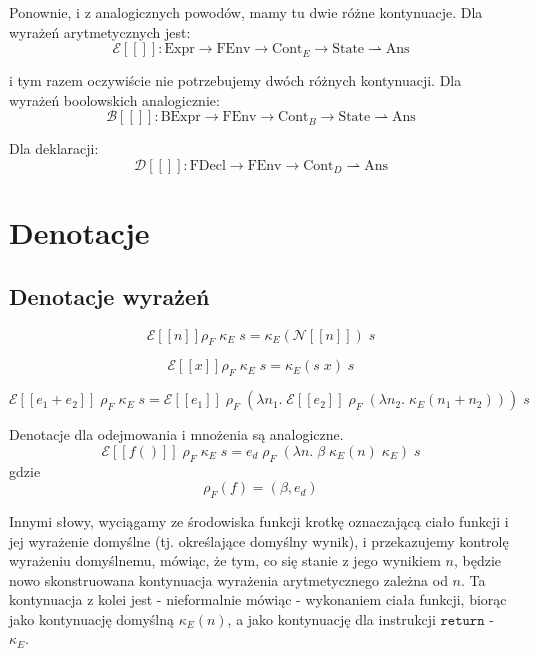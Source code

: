 \documentclass[a4paper]{article}
\begin{document}
Ponownie, i z analogicznych powodów, mamy tu dwie różne kontynuacje. Dla wyrażeń arytmetycznych jest:
$$
\mathcal{E}[\![]\!]: \text{Expr} \longrightarrow \text{FEnv} \longrightarrow \text{Cont}_E \longrightarrow \text{State} \rightharpoonup \text{Ans}
$$

i tym razem oczywiście nie potrzebujemy dwóch różnych kontynuacji. Dla wyrażeń boolowskich analogicznie:
$$
\mathcal{B}[\![]\!]: \text{BExpr} \longrightarrow \text{FEnv} \longrightarrow \text{Cont}_B \longrightarrow \text{State} \rightharpoonup \text{Ans}
$$

Dla deklaracji:
$$
\mathcal{D}[\![]\!]: \text{FDecl} \longrightarrow \text{FEnv} \longrightarrow \text{Cont}_D \rightharpoonup \text{Ans}
$$


\section*{Denotacje}

\subsection*{Denotacje wyrażeń}

$$
\mathcal{E}[\![n]\!] \rho_F \; \kappa_E \; s = \kappa_E(\mathcal{N}[\![n]\!]) \; s
$$

$$
\mathcal{E}[\![ x ]\!] \rho_F \; \kappa_E \; s = \kappa_E(s \; x) \; s
$$

$$
\mathcal{E}[\![e_1 + e_2]\!] \; \rho_F \; \kappa_E \; s = \mathcal{E}[\![e_1]\!] \; \rho_F \; (\lambda n_1. \;
\mathcal{E}[\![e_2]\!] \; \rho_F \; (\lambda n_2. \;
\kappa_E (n_1+n_2))) \; s
$$

Denotacje dla odejmowania i mnożenia są analogiczne. \\

$$
\mathcal{E}[\![ f() ]\!] \; \rho_F \; \kappa_E \; s = e_d \; \rho_F \; (\lambda n. \; \beta \; \kappa_E(n) \; \kappa_E)\;  s
$$
gdzie
$$
\rho_F(f) = (\beta, e_d)
$$

Innymi słowy, wyciągamy ze środowiska funkcji krotkę oznaczającą ciało funkcji i jej wyrażenie domyślne (tj. określające domyślny wynik), i przekazujemy kontrolę wyrażeniu domyślnemu, mówiąc, że tym, co się stanie z jego wynikiem $n$, będzie nowo skonstruowana kontynuacja wyrażenia arytmetycznego zależna od $n$. Ta kontynuacja z kolei jest - nieformalnie mówiąc - wykonaniem ciała funkcji, biorąc jako kontynuację domyślną $\kappa_E(n)$, a jako kontynuację dla instrukcji $\texttt{return}$ - $\kappa_E$.
\end{document}
